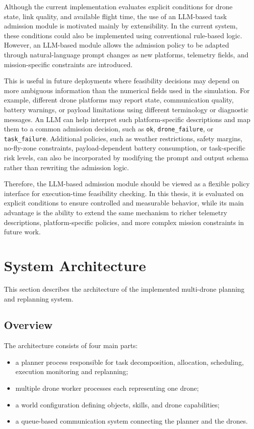 Although the current implementation evaluates explicit conditions for drone state,
link quality, and available flight time, the use of an LLM-based task admission module is
motivated mainly by extensibility. In the current system, these conditions could also be
implemented using conventional rule-based logic. However, an LLM-based module allows the
admission policy to be adapted through natural-language prompt changes as new platforms,
telemetry fields, and mission-specific constraints are introduced.

This is useful in future deployments where feasibility decisions may depend on more ambiguous
information than the numerical fields used in the simulation. For example,
different drone platforms may report state, communication quality, battery warnings, or
payload limitations using different terminology or diagnostic messages. An LLM can help
interpret such platform-specific descriptions and map them to a common admission decision,
such as \texttt{ok}, \texttt{drone\_failure}, or \texttt{task\_failure}. Additional policies, such as
weather restrictions, safety margins, no-fly-zone constraints, payload-dependent battery
consumption, or task-specific risk levels, can also be incorporated by modifying the prompt
and output schema rather than rewriting the admission logic.

Therefore, the LLM-based admission module should be viewed as a flexible policy interface
for execution-time feasibility checking. In this thesis, it is evaluated on explicit conditions
to ensure controlled and measurable behavior, while its main advantage is the ability to
extend the same mechanism to richer telemetry descriptions, platform-specific policies, and
more complex mission constraints in future work.

\section{System Architecture}

This section describes the architecture of the implemented multi-drone planning and replanning system.

\subsection{Overview}

The architecture consists of four main parts:

\begin{itemize}
    \item a planner process responsible for task decomposition, allocation, scheduling, execution monitoring and replanning;
    \item multiple drone worker processes each representing one drone;
    \item a world configuration defining objects, skills, and drone capabilities;
    \item a queue-based communication system connecting the planner and the drones.
\end{itemize}

